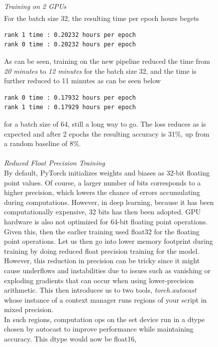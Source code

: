 \documentclass[12pt]{article}
\newcommand{\customtext}[3]{%
    \vspace{#2} %
    \fontsize{13}{8}\textcolor{#1}{\textit{#3}}%
}
\newcommand{\sidecite}[1]{\textsuperscript{\textcolor{blue}{\textbf{\scriptsize#1}}}}
\newcommand{\maincitecount}{\sidecite{\stepcounter{maincite}\themaincite}}
\begin{document}
\begin{figure}[!htb]
    \begin{minipage}[t]{0.65\textwidth}
    \customtext{xtitle}{0em}{Training on 2 GPUs}\\
For the batch size 32, the resulting time per epoch hours begets\maincitecount
\begin{lstlisting}[language=bash,style=bash,basicstyle=\ttfamily\footnotesize]
rank 1 time : 0.20232 hours per epoch
rank 0 time : 0.20232 hours per epoch
\end{lstlisting}
As can be seen, training on the new pipeline reduced the time from {\it 20 minutes}
to {\it 12 minutes} for the batch size 32, and the time is further reduced to {11 minutes}
as can be seen below 
\begin{lstlisting}[language=bash,style=bash,basicstyle=\ttfamily\footnotesize]
rank 0 time : 0.17932 hours per epoch
rank 1 time : 0.17929 hours per epoch
\end{lstlisting}
for a batch size of 64, still a long way to go. The loss reduces as is expected 
and after 2 epochs the resulting accuracy is 31\%, up from a random baseline of 
8\%.\\
\vspace{0.5em}\\
\customtext{xtitle}{0em}{Reduced Float Precision Training}\\
By default, PyTorch initializes weights and biases as 32-bit floating point values.
Of course, a larger number of bits corresponds to a higher precision, which lowers 
the chance of errors accumulating during computations. However, in deep learning, 
because it has been computationally expensive, 32 bits has then been adopted. GPU 
hardware is also not optimized for 64-bit floating point operations.\\
Given this, then the earlier training used float32 for the floating point operations.
Let us then go into lower memory footprint during training by doing reduced float 
precision training for the model. However, this reduction in precision can be tricky 
since it might cause underflows and instabilities due to issues such as 
vanishing or exploding gradients that can occur when using lower-precision arithmetic.
This then introduces us to two tools, {\it\color{xlink}torch.autocast} whose instance 
of a context manager runs regions of your script in mixed precision.\\
In such regions, computation ops on the set device run in a dtype chosen by autocast to 
improve performance while maintaining accuracy. This dtype would now be float16, 

\end{minipage}
\end{figure}
\end{document}
